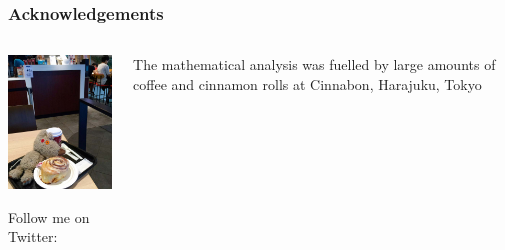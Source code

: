 \begin{frame}
  \frametitle{Acknowledgements}

  \ungap[1]
  \begin{columns}[T]
    \begin{column}{55mm}
      \includegraphics[width=52mm]{img/ratti_cinnamon_rolls}
      
      \scriptsize
      Follow me on Twitter: 
    \end{column}
    \begin{column}{50mm}
      The mathematical analysis was fuelled by large amounts of coffee and cinnamon rolls at Cinnabon, Harajuku, Tokyo

    \end{column}
  \end{columns}
\end{frame}

